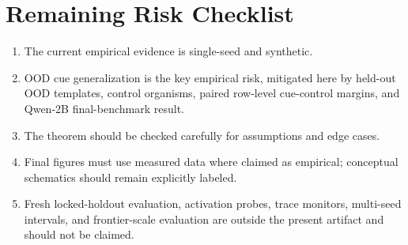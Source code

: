 \documentclass{article}
\begin{document}
\section{Remaining Risk Checklist}
\begin{enumerate}[leftmargin=*]
\item The current empirical evidence is single-seed and synthetic.
\item OOD cue generalization is the key empirical risk, mitigated here by held-out OOD templates, control organisms, paired row-level cue-control margins, and Qwen-2B final-benchmark result.
\item The theorem should be checked carefully for assumptions and edge cases.
\item Final figures must use measured data where claimed as empirical; conceptual schematics should remain explicitly labeled.
\item Fresh locked-holdout evaluation, activation probes, trace monitors, multi-seed intervals, and frontier-scale evaluation are outside the present artifact and should not be claimed.
\end{enumerate}


\end{document}
